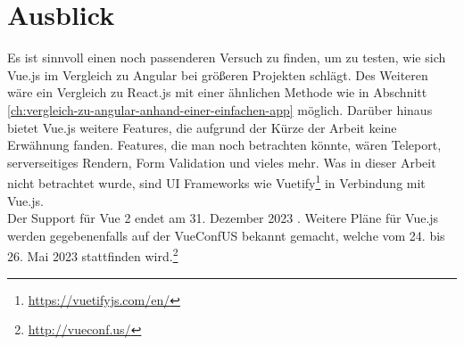 

\chapter{Ausblick}
Es ist sinnvoll einen noch passenderen Versuch zu finden, um zu testen,
wie sich Vue.js im Vergleich zu Angular bei größeren Projekten schlägt.
Des Weiteren wäre ein Vergleich zu React.js mit einer ähnlichen Methode wie in Abschnitt \ref{ch:vergleich-zu-angular-anhand-einer-einfachen-app} möglich.
Darüber hinaus bietet Vue.js weitere Features, die aufgrund der Kürze der Arbeit keine Erwähnung fanden.
Features, die man noch betrachten könnte, wären Teleport, serverseitiges Rendern, Form Validation und vieles mehr.
Was in dieser Arbeit nicht betrachtet wurde, sind UI Frameworks wie Vuetify\footnote{\url{https://vuetifyjs.com/en/}} in Verbindung mit Vue.js.
\\
Der Support für Vue 2 endet am 31. Dezember 2023 \cite{vueFAQ}.
Weitere Pläne für Vue.js werden gegebenenfalls auf der VueConfUS bekannt gemacht, welche vom 24. bis 26. Mai 2023 stattfinden wird.\footnote{\url{http://vueconf.us/}}